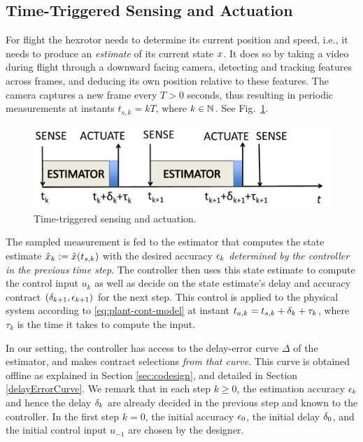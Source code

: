 \subsection{Time-Triggered Sensing and Actuation}
For flight the hexrotor needs to determine its current position and speed, i.e., it needs to produce an \emph{estimate} of its current state $x$.
It does so by taking a video during flight through a downward facing camera, detecting and tracking features across frames, and deducing its own position relative to these features.
The camera captures a new frame every $T > 0$ seconds, thus resulting in periodic measurements at instants $t_{s,k}=kT$,
where $k\in\mathbb{N}$.
See Fig.~\ref{fig:senseActuate}.
\begin{figure}[t]
\centering
\includegraphics[width=0.7\linewidth]{figures/senseActuate}
\caption{Time-triggered sensing and actuation.}
\label{fig:senseActuate}
\end{figure}

The sampled measurement is fed to the estimator that computes the state
estimate $\hat{x}_{k}:=\hat{x}(t_{s,k})$ with the desired
accuracy $\epsilon_k$ \emph{determined by the controller in the previous time step}.
The controller then uses this state estimate
to compute the control input $u_{k}$ as well as decide on the
state estimate's delay and accuracy contract $(\delta_{k+1},\epsilon_{k+1})$ for the next step.
This control is applied to the physical system according to \eqref{eq:plant-cont-model} at instant $t_{a,k} = t_{s,k}+\delta_k + \tau_k$, where $\tau_k$ is the time it takes to compute the input.

In our setting, the controller has access to the delay-error curve $\Delta$ of the estimator, and makes contract selections \emph{from that curve}.
This curve is obtained offline as explained in Section \ref{sec:codesign}, and detailed in Section \ref{delayErrorCurve}.
We remark that in each step $k\geq0$, the estimation accuracy $\epsilon_k$
and hence the delay $\delta_k$ are already decided in the previous
step and known to the controller.
In the first step $k=0$, the
initial accuracy $\epsilon_0$, the initial delay $\delta_0$, and
the initial control input $u_{-1}$ are chosen by the designer.

